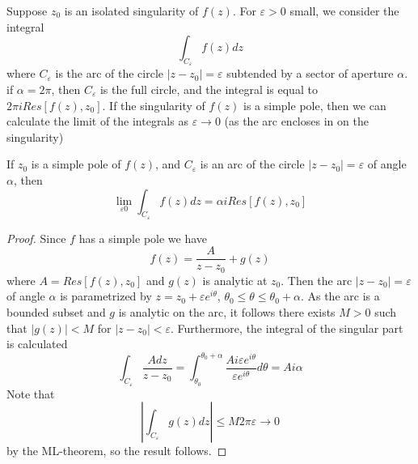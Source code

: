 Suppose $z_0$ is an isolated singularity of $f(z)$. For $\varepsilon > 0$ small, we consider the integral \begin{equation*}
    \int_{C_{\varepsilon}}f(z)dz
\end{equation*}
where $C_{\varepsilon}$ is the arc of the circle $|z-z_0| = \varepsilon$ subtended by a sector of aperture $\alpha$. if $\alpha = 2\pi$, then $C_{\varepsilon}$ is the full circle, and the integral is equal to $2\pi iRes[f(z),z_0]$. If the singularity of $f(z)$ is a simple pole, then we can calculate the limit of the integrals as $\varepsilon \rightarrow 0$ (as the arc encloses in on the singularity)

\begin{theorem}
    If $z_0$ is a simple pole of $f(z)$, and $C_{\varepsilon}$ is an arc of the circle $|z-z_0| = \varepsilon$ of angle $\alpha$, then \begin{equation*}
        \lim\limits_{\varepsilon 0}\int_{C_{\varepsilon}}f(z)dz = \alpha iRes[f(z),z_0]
    \end{equation*}
\end{theorem}
\begin{proof}
    Since $f$ has a simple pole we have \begin{equation*}
        f(z) = \frac{A}{z-z_0}+g(z)
    \end{equation*}
    where $A = Res[f(z),z_0]$ and $g(z)$ is analytic at $z_0$. Then the arc $|z-z_0| = \varepsilon$ of angle $\alpha$ is parametrized by $z = z_0+\varepsilon e^{i\theta}$, $\theta_0\leq \theta\leq \theta_0+\alpha$. As the arc is a bounded subset and $g$ is analytic on the arc, it follows there exists $M > 0$ such that $|g(z)| < M$ for $|z-z_0| < \varepsilon$. Furthermore, the integral of the singular part is calculated \begin{equation*}
        \int_{C_{\varepsilon}}\frac{Adz}{z-z_0} = \int_{\theta_0}^{\theta_0+\alpha}\frac{Ai\varepsilon e^{i\theta}}{\varepsilon e^{i\theta}}d\theta = Ai\alpha
    \end{equation*}
    Note that \begin{equation*}
        \left|\int_{C_{\varepsilon}}g(z)dz\right| \leq M2\pi\varepsilon\rightarrow 0
    \end{equation*}
    by the ML-theorem, so the result follows.
\end{proof}


